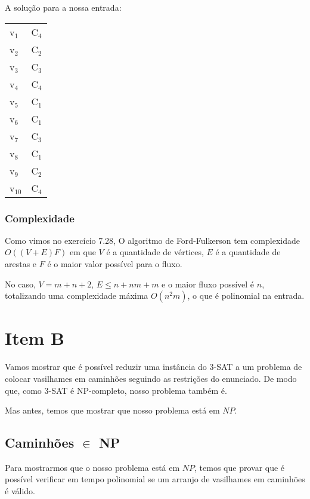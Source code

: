 \documentclass[11pt]{article}
\begin{document}
A solução para a nossa entrada:
\begin{center}
\begin{tabular}{ll}
v$_{\text{1}}$ & C$_{\text{4}}$\\
v$_{\text{2}}$ & C$_{\text{2}}$\\
v$_{\text{3}}$ & C$_{\text{3}}$\\
v$_{\text{4}}$ & C$_{\text{4}}$\\
v$_{\text{5}}$ & C$_{\text{1}}$\\
v$_{\text{6}}$ & C$_{\text{1}}$\\
v$_{\text{7}}$ & C$_{\text{3}}$\\
v$_{\text{8}}$ & C$_{\text{1}}$\\
v$_{\text{9}}$ & C$_{\text{2}}$\\
v$_{\text{10}}$ & C$_{\text{4}}$\\
\end{tabular}
\end{center}

\subsubsection{Complexidade}
\label{sec-2-1-2}

Como vimos no exercício 7.28, O algoritmo de Ford-Fulkerson tem
complexidade $O((V + E)F)$ em que $V$ é a quantidade de vértices, $E$
é a quantidade de arestas e $F$ é o maior valor possível para o fluxo.

No caso, $V = m + n + 2$, $E \leq n + nm + m$ e o maior fluxo possível é
$n$, totalizando uma complexidade máxima $O(n^2m)$, o que é polinomial na
entrada.

\section{Item B}
\label{sec-3}

Vamos mostrar que é possível reduzir uma instância do 3-SAT a um
problema de colocar vasilhames em caminhões seguindo as restrições do
enunciado. De modo que, como 3-SAT é NP-completo, nosso problema
também é.

Mas antes, temos que mostrar que nosso problema está em $NP$.

\subsection{Caminhões $\in$ NP}
\label{sec-3-1}

Para mostrarmos que o nosso problema está em $NP$, temos que provar
que é possível verificar em tempo polinomial se um arranjo de
vasilhames em caminhões é válido.
\end{document}
